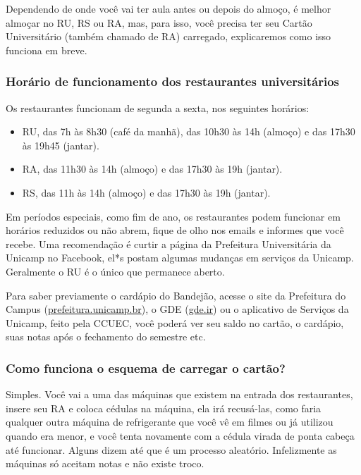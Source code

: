 Dependendo de onde você vai ter aula antes ou depois do almoço, é melhor
almoçar no RU, RS ou RA, mas, para isso, você precisa ter seu Cartão
Universitário (também chamado de RA) carregado, explicaremos como isso funciona
em breve.

\subsubsection{Horário de funcionamento dos restaurantes universitários}

Os restaurantes funcionam de segunda a sexta, nos seguintes horários:

\begin{itemize}
\item RU, das 7h às 8h30 (café da manhã), das 10h30 às 14h (almoço) e das 17h30
 às 19h45 (jantar).
\item RA, das 11h30 às 14h (almoço) e das 17h30 às 19h (jantar).
\item RS, das 11h às 14h (almoço) e das 17h30 às 19h (jantar).
\end{itemize}

Em períodos especiais, como fim de ano, os restaurantes podem funcionar em
horários reduzidos ou não abrem, fique de olho nos emails e informes que você
recebe. Uma recomendação é curtir a página da Prefeitura Universitária da
Unicamp no Facebook, el*s postam algumas mudanças em serviços da Unicamp.
Geralmente o RU é o único que permanece aberto.

Para saber previamente o cardápio do Bandejão, acesse o site da Prefeitura do
Campus (\url{prefeitura.unicamp.br}), o GDE (\url{gde.ir}) ou o aplicativo de
Serviços da Unicamp, feito pela CCUEC, você poderá ver seu saldo no cartão, o
cardápio, suas notas após o fechamento do semestre etc.

\subsubsection{Como funciona o esquema de carregar o cartão?}

Simples. Você vai a uma das máquinas que existem na entrada dos restaurantes,
insere seu RA e coloca cédulas na máquina, ela irá recusá-las, como faria
qualquer outra máquina de refrigerante que você vê em filmes ou já utilizou
quando era menor, e você tenta novamente com a cédula virada de ponta cabeça
até funcionar. Alguns dizem até que é um processo aleatório. Infelizmente as
máquinas só aceitam notas e não existe troco.

